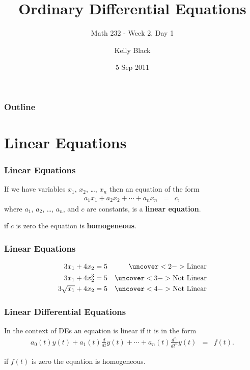 
\title{Ordinary Differential Equations}
\subtitle{Math 232 - Week 2, Day 1}

\author{Kelly Black}
\date{5 Sep 2011}

\begin{frame}
  \titlepage
\end{frame}

\begin{frame}
  \frametitle{Outline}
\end{frame}


\section{Linear Equations}


\begin{frame}
  \frametitle{Linear Equations}

  If we have variables $x_1$, $x_2$, \ldots, $x_n$ then an equation of
  the form
  \begin{eqnarray*}
    a_1 x_1 + a_2 x_2 + \cdots + a_n x_n & = & c,
  \end{eqnarray*}
  where $a_1$, $a_2$, \ldots, $a_n$, and $c$ are constants, is a
  \textbf{linear equation}.

  if $c$ is zero the equation is \textbf{homogeneous}.

\end{frame}


\begin{frame}
  \frametitle{Linear Equations}

  \begin{eqnarray*}
    3 x_1 + 4 x_2 = 5 & & \uncover<2->{\mathrm{Linear}} \\
    3 x_1 + 4 x^3_2 = 5 & & \uncover<3->{\mathrm{Not~Linear}} \\
    3 \sqrt{x_1} + 4 x_2 = 5 & & \uncover<4->{\mathrm{Not~Linear}} \\
  \end{eqnarray*}


\end{frame}


\begin{frame}
  \frametitle{Linear Differential Equations}

  In the context of DEs an equation is linear if it is in the form 
  \begin{eqnarray*}
    a_0(t) y(t) + a_1(t) \frac{d}{dt}y(t) + \cdots +
    a_n(t) \frac{d^n}{dt^n}y(t) & = & f(t).
  \end{eqnarray*}

  if $f(t)$ is zero the equation is homogeneous.

\end{frame}


